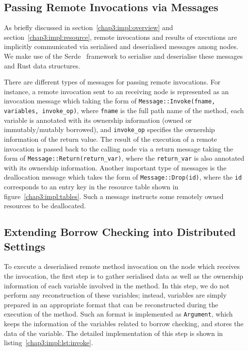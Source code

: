\subsection{Passing Remote Invocations via Messages}
\label{impl:message}
As briefly discussed in section~\ref{chap3:impl:overview} and section~\ref{chap3:impl:resource}, remote invocations and results of executions are implicitly communicated via serialised and deserialised messages among nodes. We make use of the Serde~\citep{serde} framework to serialise and deserialise these messages and Rust data structures.

There are different types of messages for passing remote invocations. For instance, a remote invocation sent to an receiving node is represented as an invocation message which taking the form of \texttt{Message::Invoke(fname, variables, invoke\_op)}, where \texttt{fname} is the full path name of the method, each variable is annotated with its ownership information (owned or immutably/mutably borrowed), and \texttt{invoke\_op} specifies the ownership information of the return value. The result of the execution of a remote invocation is passed back to the calling node via a return message taking the form of \texttt{Message::Return(return\_var)}, where the \texttt{return\_var} is also annotated with its ownership information. Another important type of messages is the deallocation message which takes the form of \texttt{Message::Drop(id)}, where the \texttt{id} corresponds to an entry key in the resource table shown in figure~\ref{chap3:impl:tables}. Such a message instructs some remotely owned resources to be deallocated.

\subsection{Extending Borrow Checking into Distributed Settings}
\label{chap3:impl:borrow}
To execute a deserialised remote method invocation on the node which receives the invocation, the first step is to gather serialised data as well as the ownership information of each variable involved in the method. In this step, we do not perform any reconstruction of these variables; instead, variables are simply prepared in an appropriate format that can be reconstructed during the execution of the method. Such an format is implemented as \texttt{Argument}, which keeps the information of the variables related to borrow checking, and stores the data of the variable. The detailed implementation of this step is shown in listing~\ref{chap3:impl:lst:invoke}.

